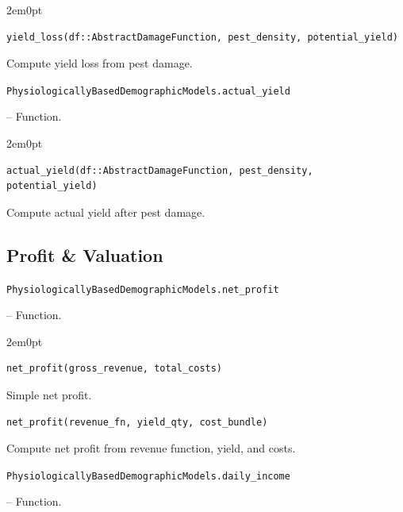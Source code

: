 \begin{adjustwidth}{2em}{0pt}


\begin{verbatim}
yield_loss(df::AbstractDamageFunction, pest_density, potential_yield)
\end{verbatim}

Compute yield loss from pest damage.



\end{adjustwidth}
\hypertarget{18145706505650173770}{\texttt{PhysiologicallyBasedDemographicModels.actual\_yield}}  -- {Function.}

\begin{adjustwidth}{2em}{0pt}


\begin{verbatim}
actual_yield(df::AbstractDamageFunction, pest_density, potential_yield)
\end{verbatim}

Compute actual yield after pest damage.



\end{adjustwidth}

\subsection{Profit \& Valuation}



\label{17554802760162051901}{}

\hypertarget{16919700004256232726}{\texttt{PhysiologicallyBasedDemographicModels.net\_profit}}  -- {Function.}

\begin{adjustwidth}{2em}{0pt}


\begin{verbatim}
net_profit(gross_revenue, total_costs)
\end{verbatim}

Simple net profit.




\begin{verbatim}
net_profit(revenue_fn, yield_qty, cost_bundle)
\end{verbatim}

Compute net profit from revenue function, yield, and costs.



\end{adjustwidth}
\hypertarget{8219925454890249670}{\texttt{PhysiologicallyBasedDemographicModels.daily\_income}}  -- {Function.}

